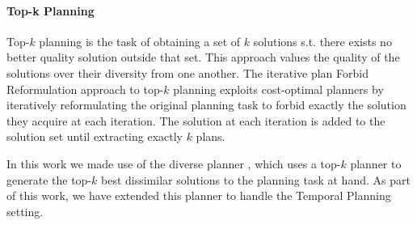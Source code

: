     
\paragraph{Top-k Planning}
Top-$k$ planning is the task of obtaining a set of $k$ solutions s.t. there exists no better quality solution outside that set. This approach values the quality of the solutions over their diversity from one another.
The iterative plan Forbid Reformulation \cite{katz2018novel} approach to top-$k$ planning
exploits cost-optimal planners by iteratively reformulating the original planning task to forbid exactly the solution they acquire at each iteration. The solution at each iteration is added to the solution set until extracting exactly $k$ plans.

In this work we made use of the diverse planner \cite{katz2019reshaping}, which uses a top-$k$ planner to generate the top-$k$ best dissimilar solutions to the planning task at hand. As part of this work, we have extended this planner to handle the Temporal Planning setting.
 